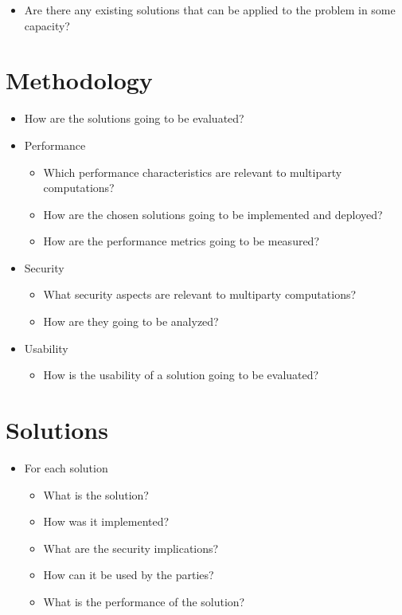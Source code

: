 \begin{itemize}
\tightlist
\item
  Are there any existing solutions that can be applied to the problem in
  some capacity?
\end{itemize}

\hypertarget{methodology}{%
\section{Methodology}\label{methodology}}

\begin{itemize}
\tightlist
\item
  How are the solutions going to be evaluated?
\item
  Performance

  \begin{itemize}
  \tightlist
  \item
    Which performance characteristics are relevant to multiparty
    computations?
  \item
    How are the chosen solutions going to be implemented and deployed?
  \item
    How are the performance metrics going to be measured?
  \end{itemize}
\item
  Security

  \begin{itemize}
  \tightlist
  \item
    What security aspects are relevant to multiparty computations?
  \item
    How are they going to be analyzed?
  \end{itemize}
\item
  Usability

  \begin{itemize}
  \tightlist
  \item
    How is the usability of a solution going to be evaluated?
  \end{itemize}
\end{itemize}

\hypertarget{solutions}{%
\section{Solutions}\label{solutions}}

\begin{itemize}
\tightlist
\item
  For each solution

  \begin{itemize}
  \tightlist
  \item
    What is the solution?
  \item
    How was it implemented?
  \item
    What are the security implications?
  \item
    How can it be used by the parties?
  \item
    What is the performance of the solution?
  \end{itemize}
\end{itemize}


